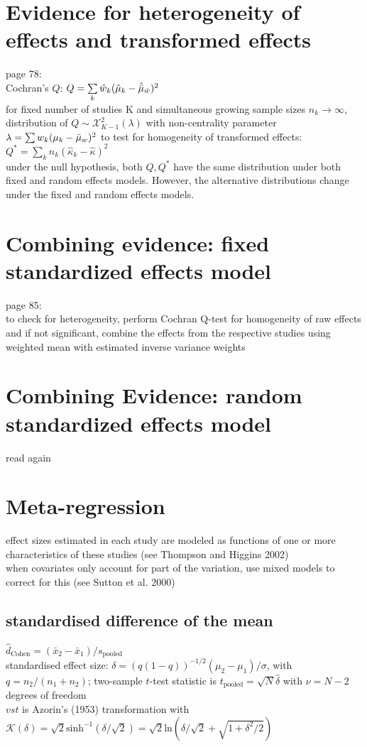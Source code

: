 \section{Evidence for heterogeneity of effects and transformed effects}
page 78:\\
Cochran's $Q$: $Q = \sum\limits_{k} \hat{w}_k(\hat{\mu}_k-\hat{\Bar{\mu}}_{\hat{w}})^2$\\
for fixed number of studies K and simultaneous growing sample sizes $n_k \rightarrow \infty$, distribution of $Q \sim \mathcal{X}_{K-1}^2(\lambda)$ with non-centrality parameter $\lambda = \sum w_k(\mu_k-\Bar{\mu}_w)^2$
to test for homogeneity of transformed effects: $Q^* = \sum\limits_k n_k(\hat{\kappa}_k - \hat{\kappa})^2$\\
under the null hypothesis, both $Q, Q^*$ have the same distribution under both fixed and random effects models. However, the alternative distributions change under the fixed and random effects models.

\section{Combining evidence: fixed standardized effects model}
page 85:\\
to check for heterogeneity, perform Cochran Q-test for homogeneity of raw effects and if not significant, combine the effects from the respective studies using weighted mean with estimated inverse variance weights\\

\section{Combining Evidence: random standardized effects model}
read again

\section{Meta-regression}
effect sizes estimated in each study are modeled as functions of one or more characteristics of these studies (see Thompson and Higgins 2002)\\
when covariates only account for part of the variation, use mixed models to correct for this (see Sutton et al. 2000)\\

\subsection{standardised difference of the mean}
$\hat{d}_{\text{Cohen}} = (\bar{x}_2-\bar{x}_1)/s_{\text{pooled}}$\\
standardised effect size: $\delta = (q(1-q))^{-1/2}(\mu_2-\mu_1)/\sigma$, with $q = n_2/(n_1+n_2)$; two-sample $t$-test statistic is $t_\text{pooled}= \sqrt{N}\hat{\delta}$ with $\nu = N-2$ degrees of freedom\\
$vst$ is Azorin's (1953) transformation with $\mathcal{K}(\delta) = \sqrt{2}\text{sinh}^{-1}(\delta/\sqrt{2}) = \sqrt{2}\text{ln}(\delta/\sqrt{2}+\sqrt{1+\delta^2/2})$\\

